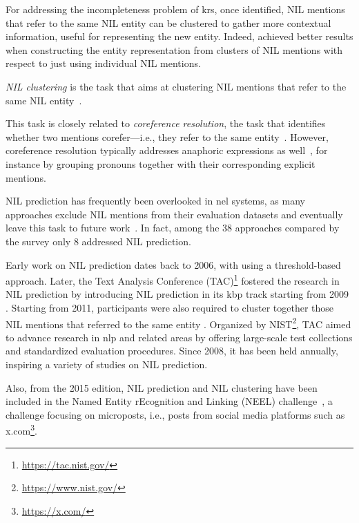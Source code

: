 For addressing the incompleteness problem of \acp{kr}, once identified, NIL mentions that refer to the same NIL entity can be clustered to gather more contextual information, useful for representing the new entity. Indeed, \textcite{kassner-etal-2022-edin} achieved better results when constructing the entity representation from clusters of NIL mentions with respect to just using individual NIL mentions.

\begin{definition}
    \emph{NIL clustering} is the task that aims at clustering NIL mentions that refer to the same NIL entity~\cite{ji2011tac}.
\end{definition}
This task is closely related to \emph{coreference resolution}, the task that identifies whether two mentions corefer---i.e., they refer to the same entity~\cite{jm3}. However, coreference resolution typically addresses anaphoric expressions as well~\cite{jm3}, for instance by grouping pronouns together with their corresponding explicit mentions.

NIL prediction has frequently been overlooked in \ac{nel}
systems, as many approaches exclude NIL mentions from their evaluation datasets and
eventually leave this task to future work~\cite{blink}. In fact, among the 38 approaches
compared by the survey \textcite{Sevgili2022NeuralEL} only 8 addressed NIL prediction. 

Early work on NIL prediction dates back to 2006, with \textcite{bunescu-pasca-2006-using} using a threshold-based approach.
Later, the Text Analysis Conference (TAC)\footnote{\url{https://tac.nist.gov/}} fostered the research in NIL prediction by introducing NIL prediction in its \acf{kbp} track starting from 2009 \cite{mcnamee2009overview}. Starting from 2011, participants were also required to cluster together those NIL mentions that referred to the same entity \cite{ji2011tac}. Organized by NIST\footnote{\url{https://www.nist.gov/}}, TAC aimed to advance research in \ac{nlp} and related areas by offering large-scale test collections and standardized evaluation procedures. Since 2008, it has been held annually, inspiring a variety of studies on NIL prediction.

Also, from the 2015 edition, NIL prediction and NIL clustering have been included in the Named Entity rEcognition and Linking (NEEL) challenge~\cite{rizzo2017lessons}, a challenge focusing on microposts, i.e., posts from social media platforms such as x.com\footnote{\url{https://x.com/}}.


